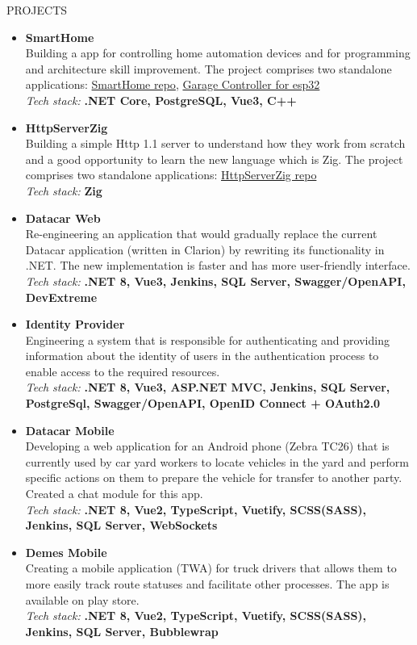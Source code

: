 \documentclass{resume}
\begin{document}
\pagebreak
\begin{rSection}{PROJECTS}
\begin{itemize}[leftmargin=0.5cm]
\item \textbf{SmartHome} \\ [0.4em]
           Building a app for controlling home automation devices and for programming and architecture skill improvement.
           The project comprises two standalone applications: \href{https://github.com/RoobyJ/SmartHome}{SmartHome repo}, \href{https://github.com/RoobyJ/GarageController}{Garage Controller for esp32}\\ [0.4em]
           \textit{Tech stack:} \textbf{.NET Core, PostgreSQL, Vue3, C++}
\item \textbf{HttpServerZig} \\ [0.4em]
           Building a simple Http 1.1 server to understand how they work from scratch and a good opportunity to learn the new language which is Zig. 
           The project comprises two standalone applications: \href{https://github.com/RoobyJ/HttpServerZig}{HttpServerZig repo}\\ [0.4em]
           \textit{Tech stack:} \textbf{Zig}
\item \textbf{Datacar Web} \\ [0.4em]
{Re-engineering an application that would gradually replace the current Datacar application (written in Clarion) by rewriting its functionality in .NET. The new implementation is faster and has more user-friendly interface.} \\ [0.4em]
\textit{Tech stack:} \textbf{.NET 8, Vue3, Jenkins, SQL Server, Swagger/OpenAPI, DevExtreme}
\item \textbf{Identity Provider} \\ [0.4em]
{Engineering a system that is responsible for authenticating and providing information about the identity of users in the authentication process to enable access to the required resources.} \\ [0.4em]
\textit{Tech stack:} \textbf{.NET 8, Vue3, ASP.NET MVC, Jenkins, SQL Server, PostgreSql, Swagger/OpenAPI, OpenID Connect + OAuth2.0}
\item \textbf{Datacar Mobile} \\ [0.4em]
{Developing a web application for an Android phone (Zebra TC26) that is currently used by car yard workers to locate vehicles in the yard and perform specific actions on them to prepare the vehicle for transfer to another party. Created a chat module for this app.} \\ [0.4em]
\textit{Tech stack:} \textbf{.NET 8, Vue2, TypeScript, Vuetify, SCSS(SASS), Jenkins, SQL Server, WebSockets}
\item \textbf{Demes Mobile} \\ [0.4em]
{Creating a mobile application (TWA) for truck drivers that allows them to more easily track route statuses and facilitate other processes. The app is available on play store.} \\ [0.4em]
\textit{Tech stack:} \textbf{.NET 8, Vue2, TypeScript, Vuetify, SCSS(SASS), Jenkins, SQL Server, Bubblewrap}
\end{itemize}
\item \end{rSection}
\end{document}
